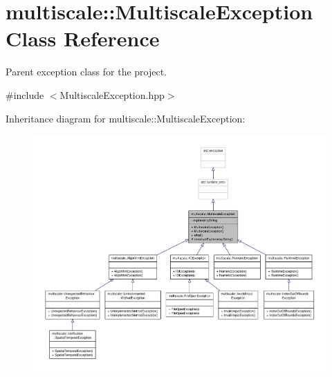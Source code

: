 \hypertarget{classmultiscale_1_1MultiscaleException}{\section{multiscale\-:\-:Multiscale\-Exception Class Reference}
\label{classmultiscale_1_1MultiscaleException}
}


Parent exception class for the project.  




{\ttfamily \#include $<$Multiscale\-Exception.\-hpp$>$}



Inheritance diagram for multiscale\-:\-:Multiscale\-Exception\-:\nopagebreak
\begin{figure}[H]
\begin{center}
\leavevmode
\includegraphics[width=350pt]{classmultiscale_1_1MultiscaleException__inherit__graph}
\end{center}
\end{figure}



